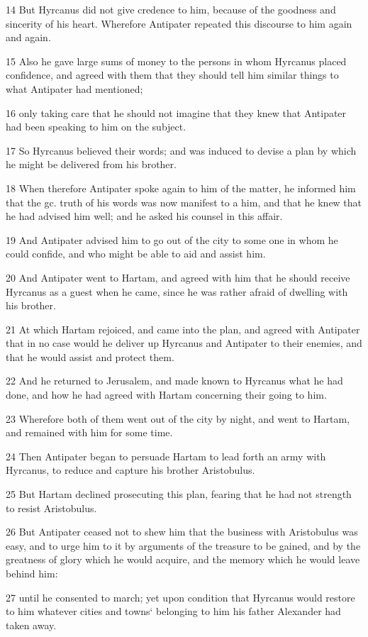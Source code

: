 14 But Hyrcanus did not give credence to him, because of the goodness and sincerity of his heart. Wherefore Antipater repeated this discourse to him again and again. 

15 Also he gave large sums of money to the persons in whom Hyrcanus placed confidence, and agreed with them that they should tell him similar things to what Antipater had mentioned; 

16 only taking care that he should not imagine that they knew that Antipater had been speaking to him on the subject. 

17 So Hyrcanus believed their words; and was induced to devise a plan by which he might be delivered from his brother. 

18 When therefore Antipater spoke again to him of the matter, he informed him that the gc. truth of his words was now manifest to a him, and that he knew that he had advised him well; and he asked his counsel in this affair. 

19 And Antipater advised him to go out of the city to some one in whom he could confide, and who might be able to aid and assist him. 

20 And Antipater went to Hartam, and agreed with him that he should receive Hyrcanus as a guest when he came, since he was rather afraid of dwelling with his brother. 

21 At which Hartam rejoiced, and came into the plan, and agreed with Antipater that in no case would he deliver up Hyrcanus and Antipater to their enemies, and that he would assist and protect them. 

22 And he returned to Jerusalem, and made known to Hyrcanus what he had done, and how he had agreed with Hartam concerning their going to him. 

23 Wherefore both of them went out of the city by night, and went to Hartam, and remained with him for some time. 

24 Then Antipater began to persuade Hartam to lead forth an army with Hyrcanus, to reduce and capture his brother Aristobulus. 

25 But Hartam declined prosecuting this plan, fearing that he had not strength to resist Aristobulus. 

26 But Antipater ceased not to shew him that the business with Aristobulus was easy, and to urge him to it by arguments of the treasure to be gained, and by the greatness of glory which he would acquire, and the memory which he would leave behind him: 

27 until he consented to march; yet upon condition that Hyrcanus would restore to him whatever cities and towns‘ belonging to him his father Alexander had taken away. 

